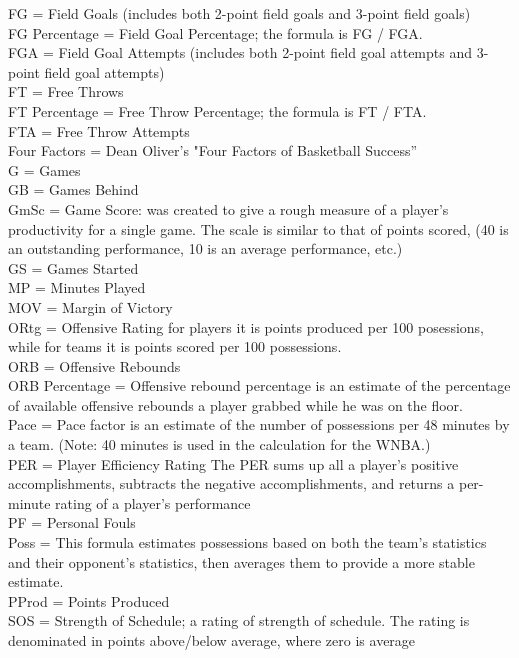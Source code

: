 \documentclass[journal,onecolumn]{IEEEtran}
\begin{document}
FG = Field Goals (includes both 2-point field goals and 3-point field goals) \\
FG Percentage = Field Goal Percentage; the formula is FG / FGA.\\
FGA = Field Goal Attempts (includes both 2-point field goal attempts and 3-point field goal attempts)\\
FT = Free Throws\\
FT Percentage = Free Throw Percentage; the formula is FT / FTA.\\
FTA = Free Throw Attempts\\
Four Factors = Dean Oliver's "Four Factors of Basketball Success”\\
G = Games\\
GB = Games Behind\\
GmSc = Game Score: was created to give a rough measure of a player's productivity for a single game. The scale is similar to that of points scored, (40 is an outstanding performance, 10 is an average performance, etc.)\\
GS = Games Started \\
MP = Minutes Played \\
MOV = Margin of Victory\\
ORtg = Offensive Rating for players it is points produced per 100 posessions, while for teams it is points scored per 100 possessions. \\
ORB = Offensive Rebounds\\
ORB Percentage = Offensive rebound percentage is an estimate of the percentage of available offensive rebounds a player grabbed while he was on the floor.\\
Pace = Pace factor is an estimate of the number of possessions per 48 minutes by a team. (Note: 40 minutes is used in the calculation for the WNBA.)\\
PER = Player Efficiency Rating The PER sums up all a player's positive accomplishments, subtracts the negative accomplishments, and returns a per-minute rating of a player's performance\\
PF = Personal Fouls\\
Poss = This formula estimates possessions based on both the team's statistics and their opponent's statistics, then averages them to provide a more stable estimate. \\
PProd = Points Produced\\
SOS = Strength of Schedule; a rating of strength of schedule. The rating is denominated in points above/below average, where zero is average\\
\end{document}
